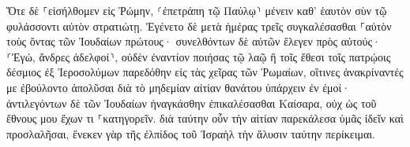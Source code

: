 \documentclass{openreader}
\begin{document}
Ὅτε δὲ ⸀εἰσήλθομεν εἰς Ῥώμην, ⸂ἐπετράπη τῷ Παύλῳ⸃ μένειν καθ’ ἑαυτὸν σὺν τῷ φυλάσσοντι αὐτὸν στρατιώτῃ. 
Ἐγένετο δὲ μετὰ ἡμέρας τρεῖς συγκαλέσασθαι ⸀αὐτὸν τοὺς ὄντας τῶν Ἰουδαίων πρώτους· συνελθόντων δὲ αὐτῶν ἔλεγεν πρὸς αὐτούς· ⸂Ἐγώ, ἄνδρες ἀδελφοί⸃, οὐδὲν ἐναντίον ποιήσας τῷ λαῷ ἢ τοῖς ἔθεσι τοῖς πατρῴοις δέσμιος ἐξ Ἱεροσολύμων παρεδόθην εἰς τὰς χεῖρας τῶν Ῥωμαίων, 
οἵτινες ἀνακρίναντές με ἐβούλοντο ἀπολῦσαι διὰ τὸ μηδεμίαν αἰτίαν θανάτου ὑπάρχειν ἐν ἐμοί· 
ἀντιλεγόντων δὲ τῶν Ἰουδαίων ἠναγκάσθην ἐπικαλέσασθαι Καίσαρα, οὐχ ὡς τοῦ ἔθνους μου ἔχων τι ⸀κατηγορεῖν. 
διὰ ταύτην οὖν τὴν αἰτίαν παρεκάλεσα ὑμᾶς ἰδεῖν καὶ προσλαλῆσαι, ἕνεκεν γὰρ τῆς ἐλπίδος τοῦ Ἰσραὴλ τὴν ἅλυσιν ταύτην περίκειμαι. 
\end{document}
